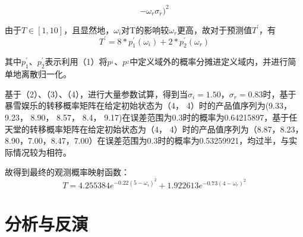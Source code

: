 \documentclass[hyperref]{ctexart}
\begin{document}
\begin{multicols}{2}
\begin{equation}
{{        - \omega_r}{\sigma_r})^2}
    \end{equation}\par
    由于$T \in [1,10]$，且显然地，$\omega_i$对T的影响较$\omega_r$更高，故对于预测值$T^'$，有
    \begin{equation}
        T^{'} = 8*p^{'}_1(\omega_i) + 2*p^{'}_2(\omega_r)
    \end{equation}\par
    其中$p^{'}_1$、$p^{'}_2$表示利用（1）将$p^_1$、$p^_2$中定义域外的概率分摊进定义域内，并进行简单地离散归一化。\par
    基于（2）、（3）、（4），进行大量参数试算，得到当$\sigma_i =1.50 $，$\sigma_r =0.83 $时，基于暴雪娱乐的转移概率矩阵在给定初始状态为（4， 4）时的产品值序列为(9.33， 9.23， 8.90， 8.57， 8.4， 9.17)在误差范围为0.3时的概率为0.64215897，基于任天堂的转移概率矩阵在给定初始状态为（4， 4）时的产品值序列为（8.87，8.23，8.90，7.00，8.47，7.00）在误差范围为0.3时的概率为0.53259921，均过半，与实际情况较为相符。\\\par
    故得到最终的观测概率映射函数：\\
    \begin{equation*}
        T = 4.255384e^{-0.22(5 - \omega_i)^2} + 1.922613e^{-0.73(4
        - \omega_r)^2}
    \end{equation*}\par
	    
	\section{分析与反演}

\end{multicols}
\end{document}
